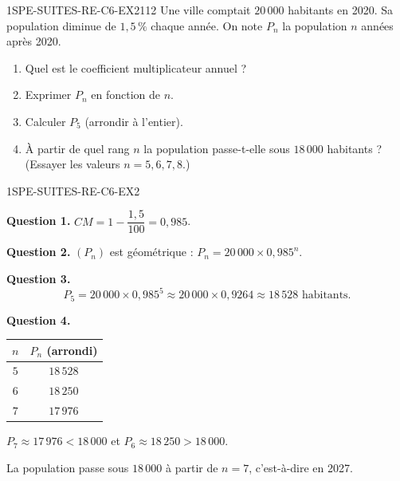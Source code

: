 
\begin{exercice}{1SPE-SUITES-RE-C6-EX2}{1}{12}
Une ville comptait $20\,000$ habitants en 2020. Sa population diminue de $1{,}5\,\%$ chaque année. On note $P_n$ la population $n$ années après 2020.
\begin{enumerate}
  \item Quel est le coefficient multiplicateur annuel ?
  \item Exprimer $P_n$ en fonction de $n$.
  \item Calculer $P_5$ (arrondir à l'entier).
  \item À partir de quel rang $n$ la population passe-t-elle sous $18\,000$ habitants ? (Essayer les valeurs $n = 5, 6, 7, 8$.)
\end{enumerate}
\end{exercice}



\begin{corrige}{1SPE-SUITES-RE-C6-EX2}

\textbf{Question 1.} $CM = 1 - \dfrac{1{,}5}{100} = 0{,}985$.

\textbf{Question 2.} $(P_n)$ est géométrique : $P_n = 20\,000 \times 0{,}985^n$.

\textbf{Question 3.}
\[
P_5 = 20\,000 \times 0{,}985^5 \approx 20\,000 \times 0{,}9264 \approx 18\,528 \text{ habitants.}
\]


\textbf{Question 4.}
\begin{center}
\begin{tabular}{|c|c|}
\hline
$n$ & $P_n$ (arrondi) \\
\hline
$5$ & $18\,528$ \\
$6$ & $18\,250$ \\
$7$ & $17\,976$ \\
\hline
\end{tabular}
\end{center}

$P_7 \approx 17\,976 < 18\,000$ et $P_6 \approx 18\,250 > 18\,000$.

La population passe sous $18\,000$ à partir de $n = 7$, c'est-à-dire en 2027.

\end{corrige}

